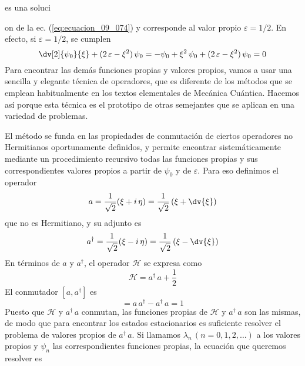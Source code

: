 es una soluci{on de la ec. (\ref{eq:ecuacion_09_074}) y corresponde al valor propio $\varepsilon = 1/2$. En efecto, si $\varepsilon = 1/2$, se cumplen
\begin{equation}
\dv[2]{\psi_{0}}{\xi} + (2 \, \varepsilon - \xi^{2}) \, \psi_{0} = - \psi_{0} + \xi^{2} \, \psi_{0} + (2 \, \varepsilon - \xi^{2}) \, \psi_{0} = 0
\label{eq:ecuacion_09_077}
\end{equation}
Para encontrar las demás funciones propias y valores propios, vamos a usar una sencilla y elegante técnica de operadores, que es diferente de los métodos que se emplean habitualmente en los textos elementales de Mecánica Cuántica. Hacemos así porque esta técnica es el prototipo de otras semejantes que se aplican en una variedad de problemas.
\par
El método se funda en las propiedades de conmutación de ciertos operadores no Hermitianos oportunamente definidos, y permite encontrar sistemáticamente mediante un procedimiento recursivo todas las funciones propias y sus correspondientes valores propios a partir de $\psi_{0}$ y de $\varepsilon$. Para eso definimos el operador
\begin{equation}
a = \dfrac{1}{\sqrt{2}} (\xi + i \, \eta) = \dfrac{1}{\sqrt{2}} \left( \xi + \dv{\xi} \right)
\label{eq:ecuacion_09_078}
\end{equation}
que no es Hermitiano, y su adjunto es
\begin{equation}
a^{\dagger} = \dfrac{1}{\sqrt{2}} (\xi - i \, \eta) = \dfrac{1}{\sqrt{2}} \left( \xi - \dv{\xi} \right)
\label{eq:ecuacion_09_079}
\end{equation}
En términos de $a$ y $a^{\dagger}$, el operador $\mathcal{H}$ se expresa como
\begin{equation}
\mathcal{H} = a^{\dagger} \, a + \dfrac{1}{2}
\label{eq:ecuacion_09_080}
\end{equation}
El conmutador $[a, a^{\dagger}]$ es
\begin{equation}
[a, a^{\dagger}] = a \, a^{\dagger} - a^{\dagger} \, a = 1
\label{eq:ecuacion_09_081}
\end{equation}
Puesto que $\mathcal{H}$ y $a^{\dagger} \, a$ conmutan, las funciones propias de $\mathcal{H}$ y $a^{\dagger} \, a$ son las mismas, de modo que para encontrar los estados estacionarios es suficiente resolver el problema de valores propios de $a^{\dagger} \, a$. Si llamamos $\lambda_{n}\, (n = 0, 1, 2, \ldots)$ a los valores propios y $\psi_{n}$ las correspondientes funciones propias, la ecuación que queremos resolver es
\begin{equation}

\end{equation}}
